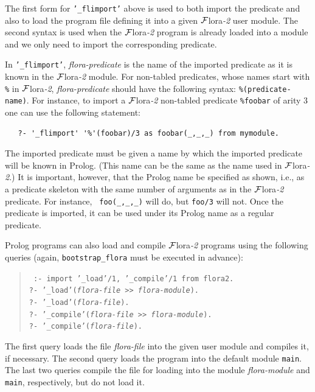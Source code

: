\documentclass[11pt]{article}
\newcommand{\FLORA}{{\mbox{\sc ${\cal F}${lora}\rm\emph{-2}}}\xspace}
\begin{document}
The first form for {\tt '\_flimport'} above is used to both import the
predicate and also to load the program file defining it into a given \FLORA
user module. The second syntax is used when the \FLORA program is already
loaded into a module and we only need to import the corresponding
predicate.

In {\tt '\_flimport'}, \emph{flora-predicate} is the name of the imported
predicate as it is known in the \FLORA module. For non-tabled predicates,
whose names start with {\tt \%} in \FLORA, \emph{flora-predicate} should
have the following syntax: {\tt \%(predicate-name)}. For instance, to
import a \FLORA non-tabled predicate {\tt \%foobar} of arity 3 one can use
the following statement:
\begin{verbatim}
   ?- '_flimport' '%'(foobar)/3 as foobar(_,_,_) from mymodule.
\end{verbatim}

  
The imported predicate must be given a name by which the imported
predicate will be known in Prolog.  (This name can be the same as the
name used in \FLORA.)  It is important, however, that the Prolog name be
specified as shown, i.e., as a predicate skeleton with the same
number of arguments as in the \FLORA predicate. For instance, {\tt
  foo(\_,\_,\_)} will do, but {\tt foo/3} will not.  Once the predicate
is imported, it can be used under its Prolog name as a regular predicate.

Prolog programs can also load and compile \FLORA programs using the following
queries (again,  {\tt bootstrap\_flora} must be executed in advance): 
\begin{quote}
 \tt
 :- import '\_load'/1, '\_compile'/1 from flora2.\\
 ?- '\_load'({\it flora-file} >> {\it flora-module}).\\
 ?- '\_load'({\it flora-file}).\\
 ?- '\_compile'({\it flora-file} >> {\it flora-module}).\\
 ?- '\_compile'({\it flora-file}).
\end{quote}
The first query loads the file {\it flora-file\/} into the given user
module and compiles it, if necessary. The second query loads the program
into the default module {\tt main}. The last two queries compile the file
for loading into the module {\it flora-module} and {\tt main},
respectively, but do not load it.
\end{document}
